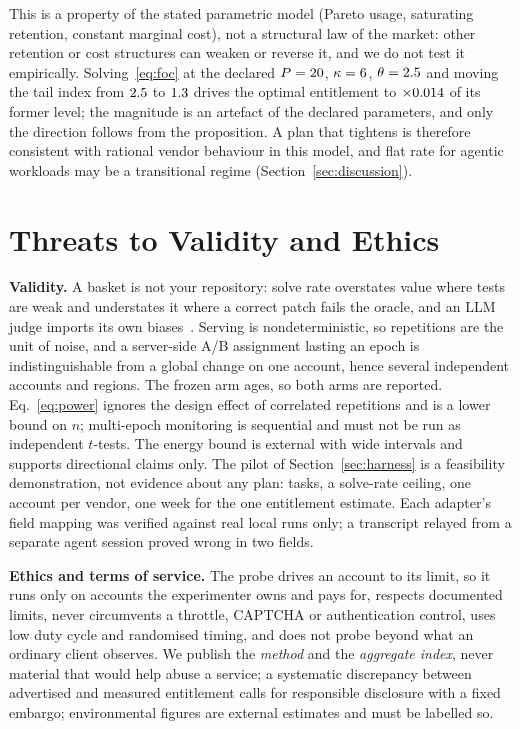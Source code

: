 \documentclass[conference]{IEEEtran}
\theoremstyle{plain}
\theoremstyle{definition}
\begin{document}
This is a property of the stated parametric model (Pareto usage, saturating
retention, constant marginal cost), not a structural law of the market: other
retention or cost structures can weaken or reverse it, and we do not test it
empirically. Solving~\eqref{eq:foc} at the declared $P=20$,
$\kappa=6$, $\theta=2.5$ and moving the tail index from
$2.5$ to $1.3$ drives the optimal entitlement to $\times0.014$
of its former level; the magnitude is an artefact of the declared parameters,
and only the direction follows from the proposition. A plan that tightens is
therefore consistent with rational vendor behaviour in this model, and flat
rate for agentic workloads may be a transitional regime
(Section~\ref{sec:discussion}).

\section{Threats to Validity and Ethics}
\label{sec:ethics}

\textbf{Validity.} A basket is not your repository: solve rate overstates
value where tests are weak and understates it where a correct patch fails the
oracle, and an LLM judge imports its own biases~\cite{zheng2023judge}. Serving
is nondeterministic, so repetitions are the unit of noise, and a server-side
A/B assignment lasting an epoch is indistinguishable from a global change on
one account, hence several independent accounts and regions. The frozen arm
ages, so both arms are reported. Eq.~\eqref{eq:power} ignores the design effect
of correlated repetitions and is a lower bound on $n$; multi-epoch monitoring
is sequential and must not be run as independent $t$-tests. The energy bound
is external with wide intervals and supports directional claims only. The
pilot of Section~\ref{sec:harness} is a feasibility demonstration, not
evidence about any plan: \pilotNTasks{} tasks, a solve-rate ceiling, one account per
vendor, one week for the one entitlement estimate. Each adapter's field
mapping was verified against real local runs only; a transcript relayed from a
separate agent session proved wrong in two fields.

\textbf{Ethics and terms of service.} The probe drives an account to its limit,
so it runs only on accounts the experimenter owns and pays for, respects
documented limits, never circumvents a throttle, CAPTCHA or authentication
control, uses low duty cycle and randomised timing, and does not probe beyond
what an ordinary client observes. We publish the \emph{method} and the
\emph{aggregate index}, never material that would help abuse a service; a
systematic discrepancy between advertised and measured entitlement calls for
responsible disclosure with a fixed embargo; environmental figures are external
estimates and must be labelled so.
\end{document}
